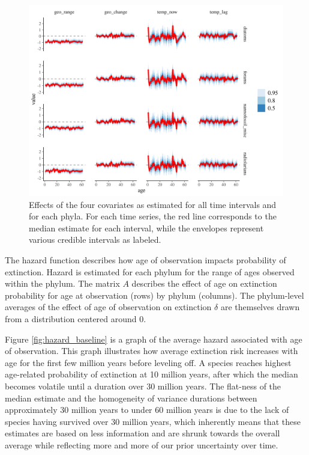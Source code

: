 \documentclass[12pt,letterpaper]{article}
\begin{document}
\begin{figure}[ht]
  \centering
  \includegraphics[width=\textwidth,height=0.5\textheight,keepaspectratio=true]{../results/figure/eff_time_group}
  \caption{Effects of the four covariates as estimated for all time intervals and for each phyla. For each time series, the red line corresponds to the median estimate for each interval, while the envelopes represent various credible intervals as labeled.}
  \label{fig:effect_time_group}
\end{figure}



The hazard function describes how age of observation impacts probability of extinction. Hazard is estimated for each phylum for the range of ages observed within the phylum. The matrix \(A\) describes the effect of age on extinction probability for age at observation (rows) by phylum (columns). The phylum-level averages of the effect of age of observation on extinction \(\delta\) are themselves drawn from a distribution centered around 0.


Figure \ref{fig:hazard_baseline} is a graph of the average hazard associated with age of observation. This graph illustrates how average extinction risk increases with age for the first few million years before leveling off. A species reaches highest age-related probability of extinction at 10 million years, after which the median becomes volatile until a duration over 30 million years. The flat-ness of the median estimate and the homogeneity of variance durations between approximately 30 million years to under 60 million years is due to the lack of species having survived over 30 million years, which inherently means that these estimates are based on less information and are shrunk towards the overall average while reflecting more and more of our prior uncertainty over time. 
\end{document}
